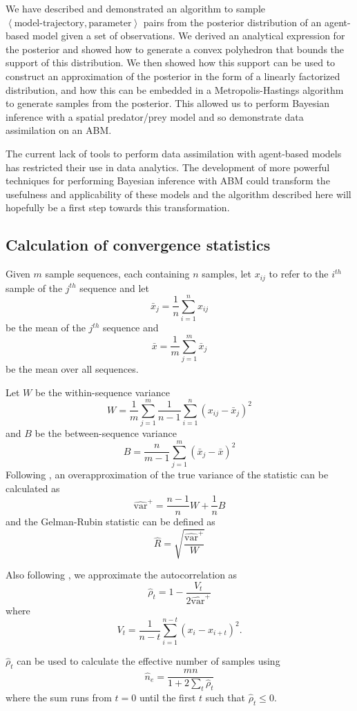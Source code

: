 \documentclass{article}
\begin{document}
We have described and demonstrated an algorithm to sample $\left<\text{model-trajectory},\text{parameter}\right>$ pairs from the posterior distribution of an agent-based model given a set of observations. We derived an analytical expression for the posterior and showed how to generate a convex polyhedron that bounds the support of this distribution. We then showed how this support can be used to construct an approximation of the posterior in the form of a linearly factorized distribution, and how this can be embedded in a Metropolis-Hastings algorithm to generate samples from the posterior. This allowed us to perform Bayesian inference with a spatial predator/prey model and so demonstrate data assimilation on an ABM.

The current lack of tools to perform data assimilation with agent-based models has restricted their use in data analytics. The development of more powerful techniques for performing Bayesian inference with ABM could transform the usefulness and applicability of these models and the algorithm described here will hopefully be a first step towards this transformation.
	
\begin{appendices} 

\section{Calculation of convergence statistics}
\label{calculatingConvergenceStats}
Given $m$ sample sequences, each containing $n$ samples, let $x_{ij}$ to refer to the $i^{th}$ sample of the $j^{th}$ sequence and let
\[
\bar{x}_j = \frac{1}{n}\sum_{i=1}^n x_{ij}
\]
be the mean of the $j^{th}$ sequence and
\[
\bar{x} = \frac{1}{m}\sum_{j=1}^m \bar{x}_j
\]
be the mean over all sequences.

Let $W$ be the within-sequence variance
\[
W = \frac{1}{m} \sum_{j=1}^m \frac{1}{n-1} \sum_{i=1}^n (x_{ij} - \bar{x}_j)^2
\]
and $B$ be the between-sequence variance
\[
B = \frac{n}{m-1}\sum_{j=1}^m (\bar{x}_j - \bar{x})^2
\]
Following \citet{gelman2013bayesian}, an overapproximation of the true variance of the statistic can be calculated as
\[
\widehat{\text{var}}^+ = \frac{n-1}{n}W + \frac{1}{n}B
\]
and the Gelman-Rubin statistic can be defined as
\[
\hat{R} = \sqrt{\frac{\widehat{\text{var}}^+}{W}}
\]

Also following \citet{gelman2013bayesian}, we approximate the autocorrelation as
\[
\hat{\rho}_t = 1 - \frac{V_t}{2\widehat{\text{var}}^+}
\]
where
\[
V_t = \frac{1}{n-t} \sum_{i=1}^{n-t} (x_i - x_{i+t})^2.
\]

$\hat{\rho}_t$ can be used to calculate the effective number of samples using
\[
\hat{n}_e = \frac{mn}{1 + 2\sum_{t} \hat{\rho}_t}
\]
where the sum runs from $t=0$ until the first $t$ such that $\hat{\rho}_t \le 0$.

\end{appendices}

%
% 


\end{document}
